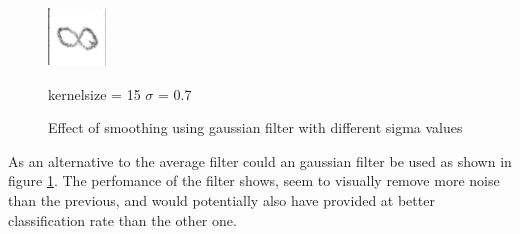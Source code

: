 \begin{figure}[H]
\begin{minipage}[t]{0.30\textwidth}
		\centering
			\includegraphics[width=0.4\linewidth]{figure/mikael_8_2_dpi300_k15_sig_07.png}
			\caption{kernelsize = 15 $\sigma$ = 0.7}
			\label{fig:fig:dpi_300_k_9_s_0.7}
	\end{minipage}
\caption{Effect of smoothing using gaussian filter with different sigma values}
\label{fig:gaussian_filter}
\end{figure}

As an alternative to the average filter could an gaussian filter be used as shown in figure \ref{fig:gaussian_filter}.  The perfomance of the filter shows, seem to visually remove more noise than the previous, and would potentially also have provided at better classification rate than the other one. 




